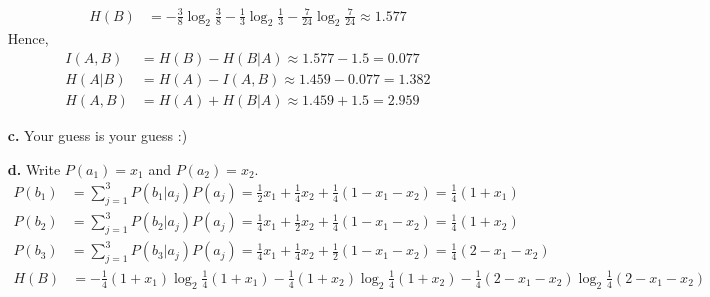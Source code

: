 \documentclass[11pt]{article}
\begin{document}
\begin{itemize}
\begin{align*}
    H(B)    &= -\frac{3}{8}\log_2 \frac{3}{8} -\frac{1}{3}\log_2 \frac{1}{3} -\frac{7}{24}\log_2 \frac{7}{24}
             \approx 1.577
  \end{align*}
  Hence,
  \begin{align*}
    I(A,B)&= H(B) - H(B|A) \approx 1.577 - 1.5   = 0.077\\
    H(A|B)&= H(A) - I(A,B) \approx 1.459 - 0.077 = 1.382\\
    H(A,B)&= H(A) + H(B|A) \approx 1.459 + 1.5   = 2.959
  \end{align*}
  \item[{\bf c.}] Your guess is your guess :)\\
  \item[{\bf d.}] Write $P(a_1) = x_1$ and $P(a_2) = x_2$.
   \begin{align*}
    P(b_1)  &= \sum_{j=1}^3 P(b_1|a_j)P(a_j)
             = \frac{1}{2}x_1
              +\frac{1}{4}x_2
              +\frac{1}{4}(1-x_1-x_2)
             = \frac{1}{4}(1+x_1)\\
    P(b_2)  &= \sum_{j=1}^3 P(b_2|a_j)P(a_j)
             = \frac{1}{4}x_1
              +\frac{1}{2}x_2
              +\frac{1}{4}(1-x_1-x_2)
             = \frac{1}{4}(1+x_2)\\
    P(b_3)  &= \sum_{j=1}^3 P(b_3|a_j)P(a_j)
             = \frac{1}{4}x_1
              +\frac{1}{4}x_2
              +\frac{1}{2}(1-x_1-x_2)
             = \frac{1}{4}(2-x_1-x_2)
   \end{align*}
   \begin{align*}
    H(B)    &=-\frac{1}{4}(1+x_1)    \log_2 \frac{1}{4}(1+x_1)
              -\frac{1}{4}(1+x_2)    \log_2 \frac{1}{4}(1+x_2)
              -\frac{1}{4}(2-x_1-x_2)\log_2 \frac{1}{4}(2-x_1-x_2)\\

\end{align*}
\end{itemize}
\end{document}
